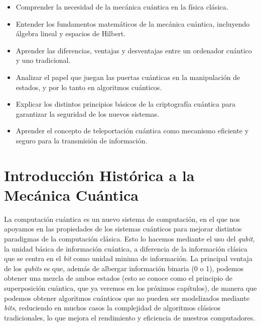 \documentclass{article}
\begin{document}
    \vspace{5mm}

    \begin{itemize}
        \item Comprender la necesidad de la mecánica cuántica en la física clásica.
        \item Entender los fundamentos matemáticos de la mecánica cuántica, incluyendo álgebra lineal y espacios de Hilbert.
        \item Aprender las diferencias, ventajas y desventajas entre un ordenador cuántico y uno tradicional.
        \item Analizar el papel que juegan las puertas cuánticas en la manipulación de estados, y por lo tanto en algoritmos cuánticos.
        \item Explicar los distintos principios básicos de la criptografía cuántica para garantizar la seguridad de los nuevos sistemas.
        \item Aprender el concepto de teleportación cuántica como mecanismo eficiente y seguro para la transmisión de información.
    \end{itemize}

    \vspace{5mm}

    \section{Introducción Histórica a la Mecánica Cuántica}

    \vspace{5mm}

    La computación cuántica es un nuevo sistema de computación, en el que nos apoyamos en las propiedades de los sistemas cuánticos para mejorar distintos paradigmas de la computación clásica. Esto lo hacemos mediante el uso del \textit{qubit}, la unidad básica de información cuántica, a diferencia de la información clásica que se centra en el \textit{bit} como unidad minima de información. La principal ventaja de los \textit{qubits} es que, además de albergar información binaria (0 o 1), podemos obtener una mezcla de ambos estados (esto se conoce como el principio de superposición cuántica, que ya veremos en los próximos capítulos), de manera que podemos obtener algoritmos cuánticos que no pueden ser modelizados mediante \textit{bits}, reduciendo en muchos casos la complejidad de algoritmos clásicos tradicionales, lo que mejora el rendimiento y eficiencia de nuestros computadores.
\end{document}
